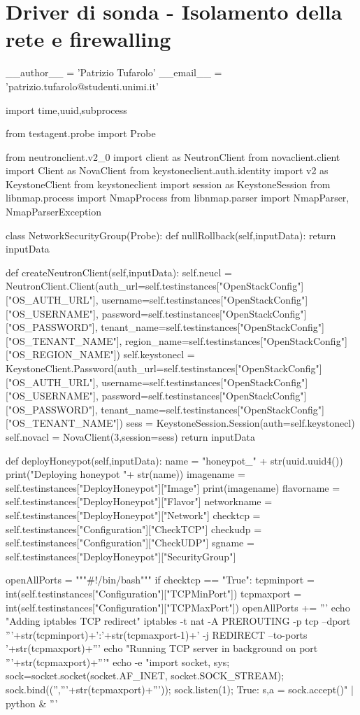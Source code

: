\appendix
\thispagestyle{plain}
\chapter{Driver di sonda - Isolamento della rete e firewalling}
\begin{python}
__author__ = 'Patrizio Tufarolo'
__email__ = 'patrizio.tufarolo@studenti.unimi.it'


import time,uuid,subprocess

from testagent.probe import Probe

from neutronclient.v2_0 import client as NeutronClient
from novaclient.client import Client as NovaClient
from keystoneclient.auth.identity import v2 as KeystoneClient
from keystoneclient import session as KeystoneSession
from libnmap.process import NmapProcess
from libnmap.parser import NmapParser, NmapParserException

class NetworkSecurityGroup(Probe):
	def nullRollback(self,inputData):
		return inputData

	def createNeutronClient(self,inputData):
		self.neucl = NeutronClient.Client(auth_url=self.testinstances["OpenStackConfig"]["OS_AUTH_URL"],
						username=self.testinstances["OpenStackConfig"]["OS_USERNAME"],
						password=self.testinstances["OpenStackConfig"]["OS_PASSWORD"],
						tenant_name=self.testinstances["OpenStackConfig"]["OS_TENANT_NAME"],
						region_name=self.testinstances["OpenStackConfig"]["OS_REGION_NAME"])
		self.keystonecl = KeystoneClient.Password(auth_url=self.testinstances["OpenStackConfig"]["OS_AUTH_URL"],
						username=self.testinstances["OpenStackConfig"]["OS_USERNAME"],
						password=self.testinstances["OpenStackConfig"]["OS_PASSWORD"],
						tenant_name=self.testinstances["OpenStackConfig"]["OS_TENANT_NAME"])
		sess = KeystoneSession.Session(auth=self.keystonecl)
		self.novacl = NovaClient(3,session=sess)
		return inputData


	def deployHoneypot(self,inputData):
		name = "honeypot_" + str(uuid.uuid4())
		print("Deploying honeypot "+ str(name))
		imagename = self.testinstances["DeployHoneypot"]["Image"]
		print(imagename)
		flavorname = self.testinstances["DeployHoneypot"]["Flavor"]
		networkname = self.testinstances["DeployHoneypot"]["Network"]
		checktcp = self.testinstances["Configuration"]["CheckTCP"]
		checkudp = self.testinstances["Configuration"]["CheckUDP"]
		sgname = self.testinstances["DeployHoneypot"]["SecurityGroup"]

		openAllPorts = """#!/bin/bash\n"""
		if checktcp == "True":
			tcpminport = int(self.testinstances["Configuration"]["TCPMinPort"])
			tcpmaxport = int(self.testinstances["Configuration"]["TCPMaxPort"])
			openAllPorts += '''
			echo "Adding iptables TCP redirect\n"
			iptables -t nat -A PREROUTING -p tcp --dport '''+str(tcpminport)+':'+str(tcpmaxport-1)+' -j REDIRECT --to-ports '+str(tcpmaxport)+'''\n
			echo "Running TCP server in background on port '''+str(tcpmaxport)+'''\n"
			echo -e "import socket, sys; sock=socket.socket(socket.AF_INET, socket.SOCK_STREAM); sock.bind(('','''+str(tcpmaxport)+''')); sock.listen(1); \nwhile True: s,a = sock.accept()\n" | python &
			\n'''


\end{python}
